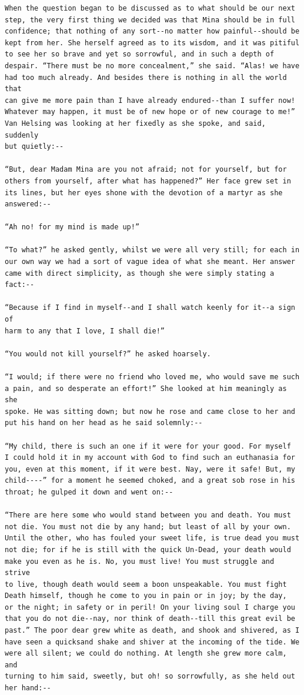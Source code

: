 \documentclass{article}
\begin{document}
\begin{verbatim}
When the question began to be discussed as to what should be our next
step, the very first thing we decided was that Mina should be in full
confidence; that nothing of any sort--no matter how painful--should be
kept from her. She herself agreed as to its wisdom, and it was pitiful
to see her so brave and yet so sorrowful, and in such a depth of
despair. “There must be no more concealment,” she said. “Alas! we have
had too much already. And besides there is nothing in all the world that
can give me more pain than I have already endured--than I suffer now!
Whatever may happen, it must be of new hope or of new courage to me!”
Van Helsing was looking at her fixedly as she spoke, and said, suddenly
but quietly:--

“But, dear Madam Mina are you not afraid; not for yourself, but for
others from yourself, after what has happened?” Her face grew set in
its lines, but her eyes shone with the devotion of a martyr as she
answered:--

“Ah no! for my mind is made up!”

“To what?” he asked gently, whilst we were all very still; for each in
our own way we had a sort of vague idea of what she meant. Her answer
came with direct simplicity, as though she were simply stating a fact:--

“Because if I find in myself--and I shall watch keenly for it--a sign of
harm to any that I love, I shall die!”

“You would not kill yourself?” he asked hoarsely.

“I would; if there were no friend who loved me, who would save me such
a pain, and so desperate an effort!” She looked at him meaningly as she
spoke. He was sitting down; but now he rose and came close to her and
put his hand on her head as he said solemnly:--

“My child, there is such an one if it were for your good. For myself
I could hold it in my account with God to find such an euthanasia for
you, even at this moment, if it were best. Nay, were it safe! But, my
child----” for a moment he seemed choked, and a great sob rose in his
throat; he gulped it down and went on:--

“There are here some who would stand between you and death. You must
not die. You must not die by any hand; but least of all by your own.
Until the other, who has fouled your sweet life, is true dead you must
not die; for if he is still with the quick Un-Dead, your death would
make you even as he is. No, you must live! You must struggle and strive
to live, though death would seem a boon unspeakable. You must fight
Death himself, though he come to you in pain or in joy; by the day,
or the night; in safety or in peril! On your living soul I charge you
that you do not die--nay, nor think of death--till this great evil be
past.” The poor dear grew white as death, and shook and shivered, as I
have seen a quicksand shake and shiver at the incoming of the tide. We
were all silent; we could do nothing. At length she grew more calm, and
turning to him said, sweetly, but oh! so sorrowfully, as she held out
her hand:--


\end{verbatim}
\end{document}
